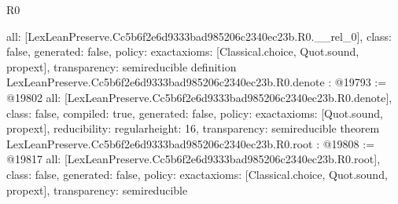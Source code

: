 \begin{lexlean}{R0}
\begin{coremodule}
{  all: [LexLeanPreserve.Cc5b6f2e6d9333bad985206c2340ec23b.R0.__rel_0],
  class: false,
  generated: false,
  policy: exact{axioms: [Classical.choice, Quot.sound, propext]},
  transparency: semireducible
}
definition LexLeanPreserve.Cc5b6f2e6d9333bad985206c2340ec23b.R0.denote : @19793 := @19802 {
  all: [LexLeanPreserve.Cc5b6f2e6d9333bad985206c2340ec23b.R0.denote],
  class: false,
  compiled: true,
  generated: false,
  policy: exact{axioms: [Quot.sound, propext]},
  reducibility: regular{height: 16},
  transparency: semireducible
}
theorem LexLeanPreserve.Cc5b6f2e6d9333bad985206c2340ec23b.R0.root : @19808 := @19817 {
  all: [LexLeanPreserve.Cc5b6f2e6d9333bad985206c2340ec23b.R0.root],
  class: false,
  generated: false,
  policy: exact{axioms: [Classical.choice, Quot.sound, propext]},
  transparency: semireducible
}


\end{coremodule}
\end{lexlean}
